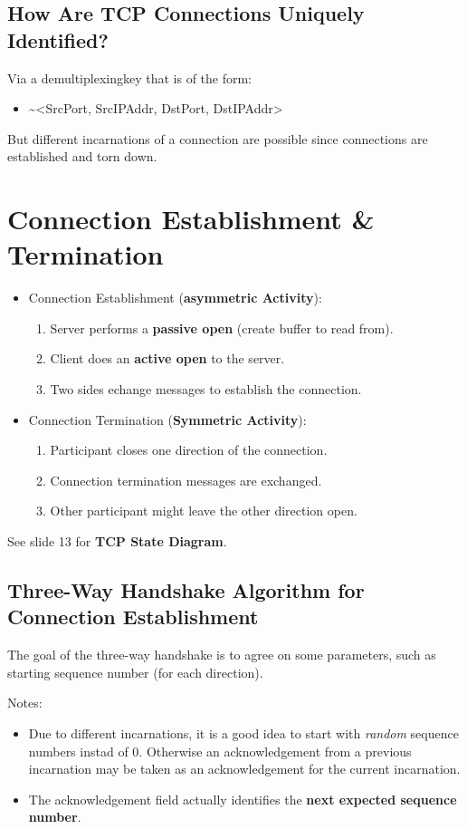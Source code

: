 \documentclass[11pt]{article}
\begin{document}
\subsection{How Are TCP Connections Uniquely Identified?}
\label{sec:org79e9abc}
Via a demultiplexingkey that is of the form:
\begin{itemize}
\item \textasciitilde{}<SrcPort, SrcIPAddr, DstPort, DstIPAddr>
\end{itemize}
But different incarnations of a connection are possible since connections are established and torn down.

\section{Connection Establishment \& Termination}
\label{sec:orgb4e581a}
\begin{itemize}
\item Connection Establishment (\textbf{asymmetric Activity}):
\begin{enumerate}
\item Server performs a \textbf{passive open} (create buffer to read from).
\item Client does an \textbf{active open} to the server.
\item Two sides echange messages to establish the connection.
\end{enumerate}
\item Connection Termination (\textbf{Symmetric Activity}):
\begin{enumerate}
\item Participant closes one direction of the connection.
\item Connection termination messages are exchanged.
\item Other participant might leave the other direction open.
\end{enumerate}
\end{itemize}
See slide 13 for \textbf{TCP State Diagram}.

\subsection{Three-Way Handshake Algorithm for Connection Establishment}
\label{sec:org7000e40}
The goal of the three-way handshake is to agree on some parameters, such as starting sequence number (for each direction).

Notes:
\begin{itemize}
\item Due to different incarnations, it is a good idea to start with \emph{random} sequence numbers instad of 0. Otherwise an acknowledgement from a previous incarnation may be taken as an acknowledgement for the current incarnation.
\item The acknowledgement field actually identifies the \textbf{next expected sequence number}.
\end{itemize}
\end{document}
